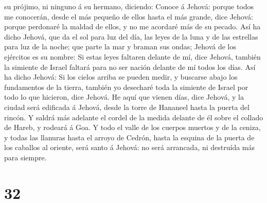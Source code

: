 su prójimo, ni ninguno á su hermano, diciendo: Conoce á Jehová: porque
todos me conocerán, desde el más pequeño de ellos hasta el más grande,
dice Jehová: porque perdonaré la maldad de ellos, y no me acordaré más
de su pecado.  Así ha dicho Jehová, que da el sol para
luz del día, las leyes de la luna y de las estrellas para luz de la
noche; que parte la mar y braman sus ondas; Jehová de los ejércitos es
su nombre:  Si estas leyes faltaren delante de mí, dice
Jehová, también la simiente de Israel faltará para no ser nación delante
de mí todos los días.  Así ha dicho Jehová: Si los cielos
arriba se pueden medir, y buscarse abajo los fundamentos de la tierra,
también yo desecharé toda la simiente de Israel por todo lo que
hicieron, dice Jehová.  He aquí que vienen días, dice
Jehová, y la ciudad será edificada á Jehová, desde la torre de Hananeel
hasta la puerta del rincón.  Y saldrá más adelante el
cordel de la medida delante de él sobre el collado de Hareb, y rodeará á
Goa.  Y todo el valle de los cuerpos muertos y de la
ceniza, y todas las llanuras hasta el arroyo de Cedrón, hasta la esquina
de la puerta de los caballos al oriente, será santo á Jehová: no será
arrancada, ni destruída más para siempre.

\hypertarget{section-31}{%
\section{32}\label{section-31}}


